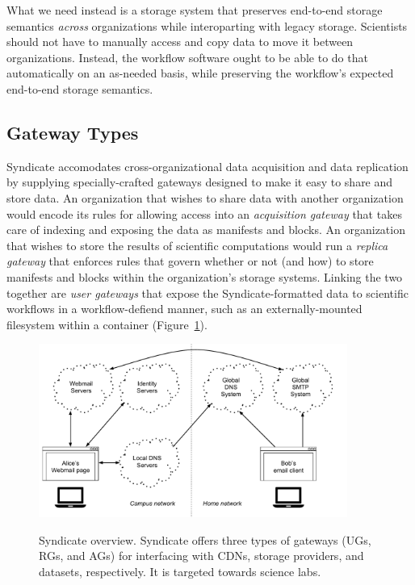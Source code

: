 What we need instead is a storage system that preserves end-to-end storage
semantics \emph{across} organizations while interoparting with legacy storage.
Scientists should not have to manually access and copy data to move it between
organizations.  Instead, the workflow
software ought to be able to do that automatically on an as-needed basis,
while preserving the workflow's expected end-to-end storage semantics.

\subsection{Gateway Types}

Syndicate accomodates cross-organizational data acquisition and
data replication by supplying specially-crafted gateways designed to make it
easy to share and store data.  An organization that wishes to share data with
another organization would encode its rules for allowing access into an
\emph{acquisition gateway} that takes care of indexing and exposing the data as
manifests and blocks.  An organization that wishes to store the results of
scientific computations would run a \emph{replica gateway} that enforces rules
that govern whether or not (and how) to store manifests and blocks within the
organization's storage systems.  Linking the two together are \emph{user
gateways} that expose the Syndicate-formatted data to scientific workflows in a
workflow-defiend manner, such as an externally-mounted filesystem within a
container (Figure~\ref{fig:chap3-syndicate-overview}).

\begin{figure}[h]
   \caption{Syndicate overview.  Syndicate offers three types of gateways (UGs,
   RGs, and AGs) for interfacing with CDNs, storage providers, and datasets,
   respectively.  It is targeted towards science labs.}
   \centering
   \includegraphics[width=0.9\textwidth,page=20]{figures/dissertation-figures}
   \label{fig:chap3-syndicate-overview}
\end{figure}


